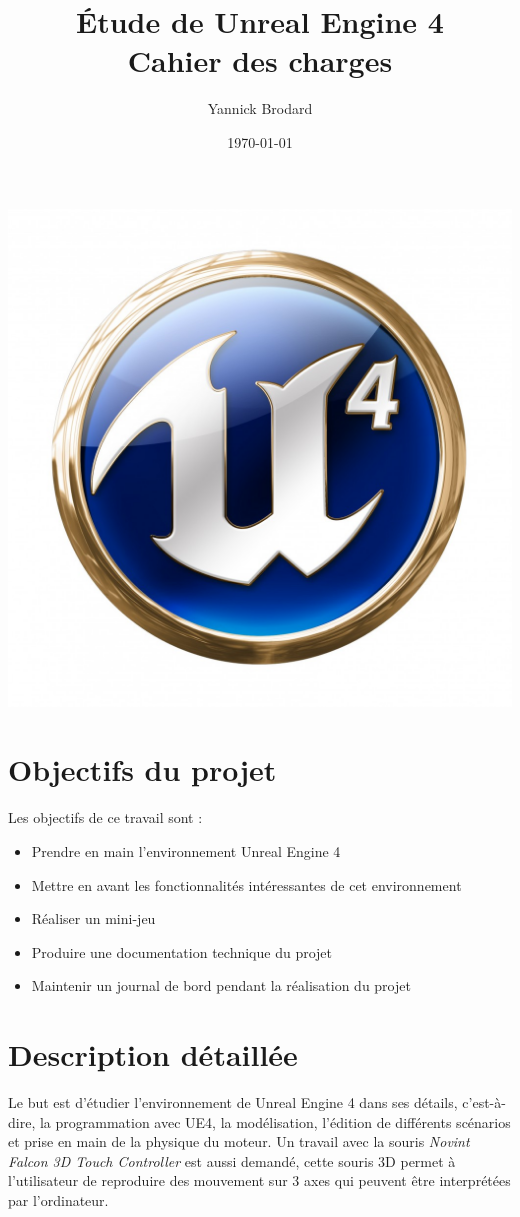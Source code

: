 \documentclass[11pt, a4paper]{article}
\title{
\Huge{Étude de Unreal Engine 4} \\[0.5cm]
\LARGE{Cahier des charges}
}
\author{Yannick Brodard}
\date{\today}
\begin{document}
\maketitle
\begin{center}
    \includegraphics[scale=0.4]{UE4_logo}
\end{center}
\thispagestyle{empty}
\newpage
\section{Objectifs du projet}
Les objectifs de ce travail sont :
\begin{itemize}
\item Prendre en main l'environnement Unreal Engine 4
\item Mettre en avant les fonctionnalités intéressantes de cet environnement
\item Réaliser un mini-jeu
\item Produire une documentation technique du projet
\item Maintenir un journal de bord pendant la réalisation du projet
\end{itemize}
\section{Description détaillée}
Le but est d'étudier l'environnement de Unreal Engine 4 dans ses détails, c'est-à-dire, la programmation avec UE4, la modélisation, l'édition de différents scénarios et prise en main de la physique du moteur. Un travail avec la souris \textit{Novint Falcon 3D Touch Controller} est aussi demandé, cette souris 3D permet à l'utilisateur de reproduire des mouvement sur 3 axes qui peuvent être interprétées par l'ordinateur.
\end{document}
